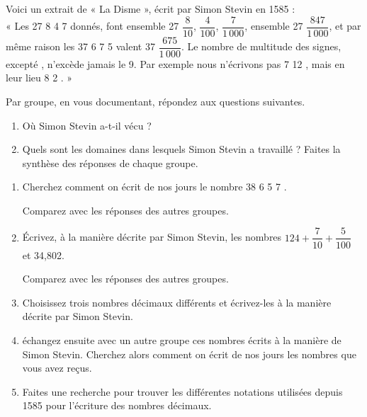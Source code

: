 
\begin{TP}[]
Voici un extrait de « La Disme », écrit par Simon Stevin en 1585 : \\[0.3em]

« Les 27  8  4  7  donnés, font ensemble 27 $\dfrac{8}{10}$, $\dfrac{4}{100}$, $\dfrac{7}{1\,000}$, ensemble 27 $\dfrac{847}{1\,000}$, et par même raison les 37  6  7  5  valent 37 $\dfrac{675}{1\,000}$. Le nombre de multitude des signes, excepté , n'excède jamais le 9. Par exemple nous n'écrivons pas 7  12 , mais en leur lieu 8  2 . »


Par groupe, en vous documentant, répondez aux questions suivantes.
\begin{enumerate}
 \item Où Simon Stevin a-t-il vécu ?
 \item Quels sont les domaines dans lesquels Simon Stevin a travaillé ? Faites la synthèse des réponses de chaque groupe.
 \end{enumerate}
 

\begin{enumerate}
\item Cherchez comment on écrit de nos jours le nombre 38  6  5  7 .

Comparez avec les réponses des autres groupes.

\item Écrivez, à la manière décrite par Simon Stevin, les nombres $124 + \dfrac{7}{10} + \dfrac{5}{100}$ et 34,802.

Comparez avec les réponses des autres groupes.

 \item Choisissez trois nombres décimaux différents et écrivez-les à la manière décrite par Simon Stevin.
 \item échangez ensuite avec un autre groupe ces nombres écrits à la manière de Simon Stevin. Cherchez alors comment on écrit de nos jours les nombres que vous avez reçus.
 \item Faites une recherche pour trouver les différentes notations utilisées depuis 1585 pour l'écriture des nombres décimaux.
 \end{enumerate}
\end{TP}


